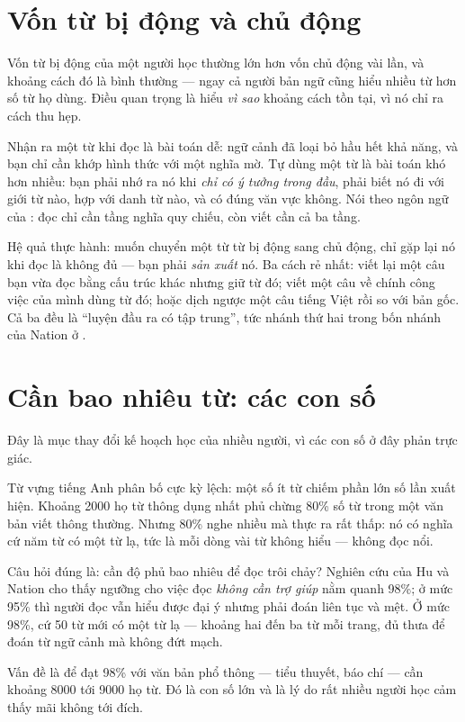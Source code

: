 \documentclass[../../english.tex]{subfiles}
\begin{document}
\section{Vốn từ bị động và chủ động}

Vốn từ bị động của một người học thường lớn hơn vốn chủ động vài lần, và khoảng cách đó là bình thường --- ngay cả người bản ngữ cũng hiểu nhiều từ hơn số từ họ dùng. Điều quan trọng là hiểu \emph{vì sao} khoảng cách tồn tại, vì nó chỉ ra cách thu hẹp.

Nhận ra một từ khi đọc là bài toán dễ: ngữ cảnh đã loại bỏ hầu hết khả năng, và bạn chỉ cần khớp hình thức với một nghĩa mờ. Tự dùng một từ là bài toán khó hơn nhiều: bạn phải nhớ ra nó khi \emph{chỉ có ý tưởng trong đầu}, phải biết nó đi với giới từ nào, hợp với danh từ nào, và có đúng văn vực không. Nói theo ngôn ngữ của : đọc chỉ cần tầng nghĩa quy chiếu, còn viết cần cả ba tầng.

Hệ quả thực hành: muốn chuyển một từ từ bị động sang chủ động, chỉ gặp lại nó khi đọc là không đủ --- bạn phải \emph{sản xuất} nó. Ba cách rẻ nhất: viết lại một câu bạn vừa đọc bằng cấu trúc khác nhưng giữ từ đó; viết một câu về chính công việc của mình dùng từ đó; hoặc dịch ngược một câu tiếng Việt rồi so với bản gốc. Cả ba đều là ``luyện đầu ra có tập trung'', tức nhánh thứ hai trong bốn nhánh của Nation ở .

\section{Cần bao nhiêu từ: các con số}

Đây là mục thay đổi kế hoạch học của nhiều người, vì các con số ở đây phản trực giác.

Từ vựng tiếng Anh phân bố cực kỳ lệch: một số ít từ chiếm phần lớn số lần xuất hiện. Khoảng 2000 họ từ thông dụng nhất phủ chừng 80\% số từ trong một văn bản viết thông thường. Nhưng 80\% nghe nhiều mà thực ra rất thấp: nó có nghĩa cứ năm từ có một từ lạ, tức là mỗi dòng vài từ không hiểu --- không đọc nổi.

Câu hỏi đúng là: cần độ phủ bao nhiêu để đọc trôi chảy? Nghiên cứu của Hu và Nation cho thấy ngưỡng cho việc đọc \emph{không cần trợ giúp} nằm quanh 98\%\cite{hunation2000}; ở mức 95\% thì người đọc vẫn hiểu được đại ý nhưng phải đoán liên tục và mệt\cite{laufer2010}. Ở mức 98\%, cứ 50 từ mới có một từ lạ --- khoảng hai đến ba từ mỗi trang, đủ thưa để đoán từ ngữ cảnh mà không đứt mạch.

Vấn đề là để đạt 98\% với văn bản phổ thông --- tiểu thuyết, báo chí --- cần khoảng 8000 tới 9000 họ từ\cite{nation2006}. Đó là con số lớn và là lý do rất nhiều người học cảm thấy mãi không tới đích.
\end{document}

